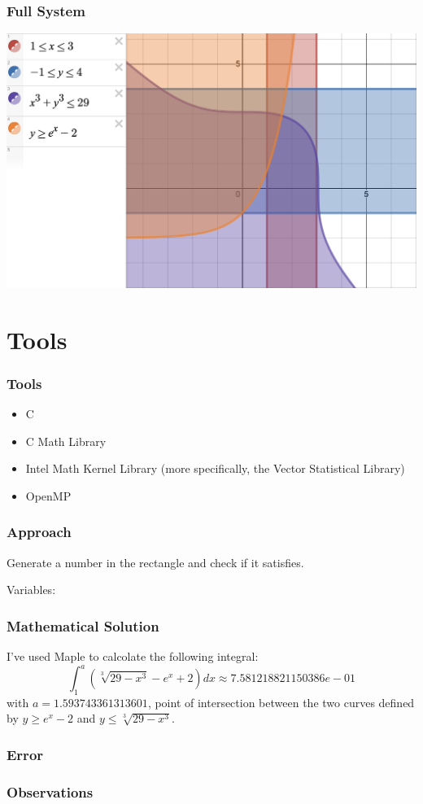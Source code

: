 \documentclass{beamer}
\begin{document}
\begin{frame}
\frametitle{Full System}
\includegraphics[width=\textwidth,height=\textheight,keepaspectratio]{full_system.png}
\end{frame}

\section{Tools}
\begin{frame}
\frametitle{Tools}
\begin{itemize}
  \item C
  \item C Math Library
  \item Intel Math Kernel Library (more specifically, the Vector Statistical Library)
  \item OpenMP
\end{itemize}
\end{frame}

\begin{frame}
\frametitle{Approach}
Generate a number in the rectangle and check if it satisfies.

Variables:
\end{frame}

\begin{frame}
\frametitle{Mathematical Solution}
I've used Maple to calcolate the following integral:
$$
\int_1^{a} (\sqrt[3]{29-x^3}-e^x+2)dx\approx 7.581218821150386e-01
$$
with $a=1.593743361313601$, point of intersection between the two curves defined by $y\ge e^x-2$ and $y\le \sqrt[3]{29-x^3}$.
\end{frame}

\begin{frame}
\frametitle{Error}
\end{frame}

\begin{frame}
\frametitle{Observations}
\end{frame}
\end{document}
